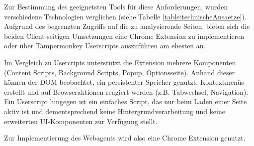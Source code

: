 Zur Bestimmung des geeignetsten Tools für diese Anforderungen,
 wurden verschiedene Technologien verglichen (siehe Tabelle \ref{table:technischeAnsaetze}).
Aufgrund des begrenzten Zugriffs auf die zu analysierende Seiten, bieten sich die beiden Client-seitigen Umsetzungen 
eine Chrome Extension zu implementieren oder über Tampermonkey Userscripts auszuführen am ehesten an.

Im Vergleich zu Usercripts unterstützt die Extension mehrere Komponenten (Content Scripts, Background Scripts, Popup, Optionsseite).
Anhand dieser können der DOM beobachtet, ein persistenter Speicher genutzt, Kontextmenüs erstellt und auf Browseraktionen reagiert werden (z.B. Tabwechsel, Navigation).
Ein Userscript hingegen ist ein einfaches Script, das nur beim Laden einer Seite aktiv ist und dementsprechend keine Hintergrundverarbeitung und keine erweiterten UI-Komponenten
zur Verfügung stellt.

Zur Implementierung des Webagents wird also eine Chrome Extension genutzt.

    
    
    